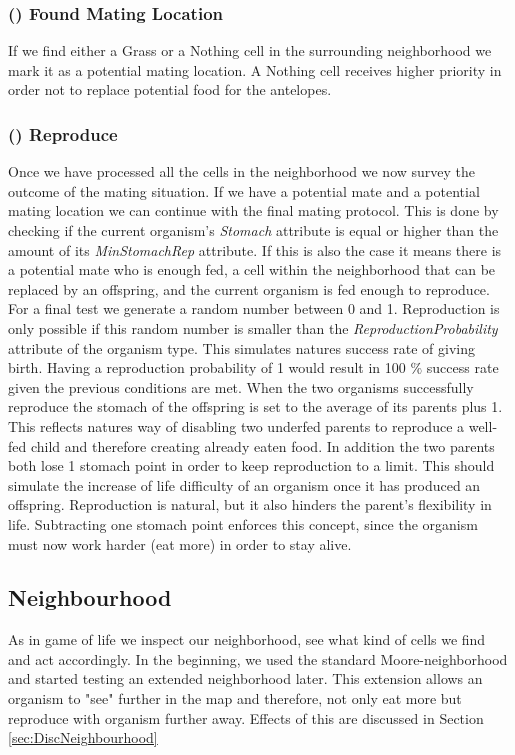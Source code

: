 \documentclass[11pt]{article}
\begin{document}
\addtocounter{protocolCounter}{1}
\subsubsection{() Found Mating Location}
If we find either a Grass or a Nothing cell in the surrounding neighborhood we mark it as a potential mating location. A Nothing cell receives higher priority in order not to replace potential food for the antelopes. 


\addtocounter{protocolCounter}{1}
\subsubsection{() Reproduce}
\label{tab:reproduction}
Once we have processed all the cells in the neighborhood we now survey the outcome of the mating situation. If we have a potential mate and a potential mating location we can continue with the final mating protocol. This is done by checking if the current organism's {\it Stomach} attribute is equal or higher than the amount of its {\it MinStomachRep} attribute. If this is also the case it means there is a potential mate who is enough fed, a cell within the neighborhood that can be replaced by an offspring, and the current organism is fed enough to reproduce. For a final test we generate a random number between 0 and 1. Reproduction is only possible if this random number is smaller than the {\it ReproductionProbability} attribute of the organism type. This simulates natures success rate of giving birth. Having a reproduction probability of 1 would result in 100 $\%$ success rate given the previous conditions are met. When the two organisms successfully reproduce the stomach of the offspring is set to the average of its parents plus 1. This reflects natures way of disabling two underfed parents to reproduce a well-fed child and therefore creating already eaten food. In addition the two parents both lose 1 stomach point in order to keep reproduction to a limit. This should simulate the increase of life difficulty of an organism once it has produced an offspring. Reproduction is natural, but it also hinders the parent's flexibility in life. Subtracting one stomach point enforces this concept, since the organism must now work harder (eat more) in order to stay alive.

\subsection{Neighbourhood}
\label{sec:neighbourhood}
As in game of life we inspect our neighborhood, see what kind of cells we find and act accordingly. 
In the beginning, we used the standard Moore-neighborhood and started testing an extended neighborhood later. This extension allows an organism to "see" further in the map and therefore, not only eat more but reproduce with organism further away. Effects of this are discussed in Section \ref{sec:DiscNeighbourhood}
\end{document}
